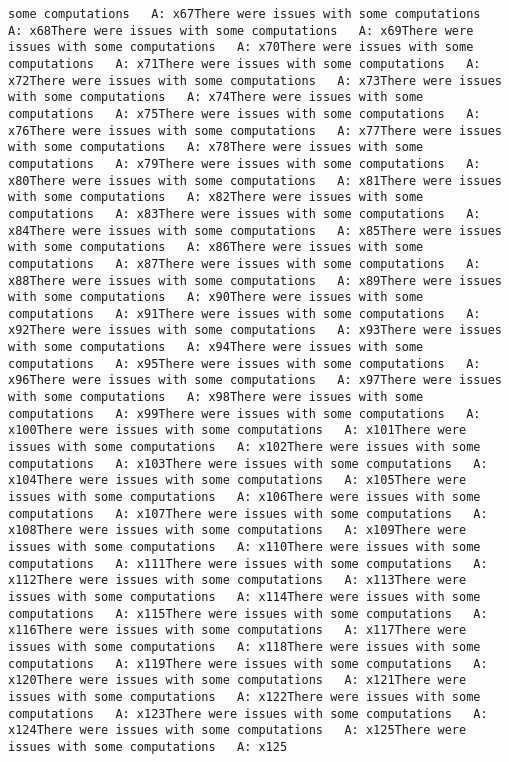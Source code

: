\documentclass[
]{article}
\begin{document}
\begin{verbatim}
some computations   A: x67There were issues with some computations   A: x68There were issues with some computations   A: x69There were issues with some computations   A: x70There were issues with some computations   A: x71There were issues with some computations   A: x72There were issues with some computations   A: x73There were issues with some computations   A: x74There were issues with some computations   A: x75There were issues with some computations   A: x76There were issues with some computations   A: x77There were issues with some computations   A: x78There were issues with some computations   A: x79There were issues with some computations   A: x80There were issues with some computations   A: x81There were issues with some computations   A: x82There were issues with some computations   A: x83There were issues with some computations   A: x84There were issues with some computations   A: x85There were issues with some computations   A: x86There were issues with some computations   A: x87There were issues with some computations   A: x88There were issues with some computations   A: x89There were issues with some computations   A: x90There were issues with some computations   A: x91There were issues with some computations   A: x92There were issues with some computations   A: x93There were issues with some computations   A: x94There were issues with some computations   A: x95There were issues with some computations   A: x96There were issues with some computations   A: x97There were issues with some computations   A: x98There were issues with some computations   A: x99There were issues with some computations   A: x100There were issues with some computations   A: x101There were issues with some computations   A: x102There were issues with some computations   A: x103There were issues with some computations   A: x104There were issues with some computations   A: x105There were issues with some computations   A: x106There were issues with some computations   A: x107There were issues with some computations   A: x108There were issues with some computations   A: x109There were issues with some computations   A: x110There were issues with some computations   A: x111There were issues with some computations   A: x112There were issues with some computations   A: x113There were issues with some computations   A: x114There were issues with some computations   A: x115There were issues with some computations   A: x116There were issues with some computations   A: x117There were issues with some computations   A: x118There were issues with some computations   A: x119There were issues with some computations   A: x120There were issues with some computations   A: x121There were issues with some computations   A: x122There were issues with some computations   A: x123There were issues with some computations   A: x124There were issues with some computations   A: x125There were issues with some computations   A: x125
\end{verbatim}
\end{document}
